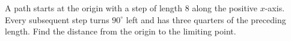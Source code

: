 A path starts at the origin with a step of length $8$ along the positive $x$-axis. Every subsequent step turns $90^\circ$ left and has three quarters of the preceding length. Find the distance from the origin to the limiting point.
